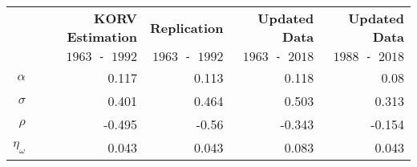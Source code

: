 \begin{tabular}{rrrrr}
  \hline\hline
   & \textbf{KORV Estimation} & \textbf{Replication} & \textbf{Updated Data} & \textbf{Updated Data} \\
   & \texttt{$1963$ - $1992$} & \texttt{$1963$ - $1992$} & \texttt{$1963$ - $2018$} & \texttt{$1988$ - $2018$} \\\hline
  $\alpha$ & 0.117 & 0.113 & 0.118 & 0.08 \\
  $\sigma$ & 0.401 & 0.464 & 0.503 & 0.313 \\
  $\rho$ & -0.495 & -0.56 & -0.343 & -0.154 \\
  $\eta_\omega$ & 0.043 & 0.043 & 0.083 & 0.043 \\\hline\hline
\end{tabular}
